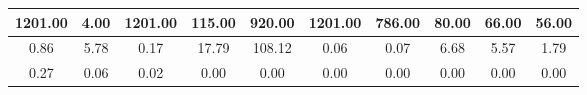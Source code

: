 \begin{tabular}{|c|c|c|c|c|c|c|c|c|c|}
\hline
1201.00&4.00&1201.00&115.00&920.00&1201.00&786.00&80.00&66.00&56.00\\\hline
0.86&5.78&0.17&17.79&108.12&0.06&0.07&6.68&5.57&1.79\\\hline
0.27&0.06&0.02&0.00&0.00&0.00&0.00&0.00&0.00&0.00\\\hline
\end{tabular}
